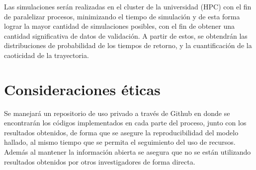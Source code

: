 	Las simulaciones ser\'an realizadas en el cluster de la universidad (HPC) con el fin de paralelizar procesos, minimizando el tiempo de simulación y de esta forma lograr la mayor cantidad de simulaciones posibles, con el fin de obtener una cantidad significativa de datos de validación. A partir de estos, se obtendr\'an las distribuciones de probabilidad de los tiempos de retorno, y la cuantificaci\'on de la caoticidad de la trayectoria.
	
\section{Consideraciones éticas}
	Se manejará un repositorio de uso privado a través de Github en donde se encontrar\'an los códigos implementados en cada parte del proceso, junto con los resultados obtenidos, de forma que se asegure la reproducibilidad del modelo hallado, al mismo tiempo que se permita el seguimiento del uso de recursos. Adem\'as al mantener la informaci\'on abierta se asegura que no se están utilizando resultados obtenidos por otros investigadores de forma directa.
	
